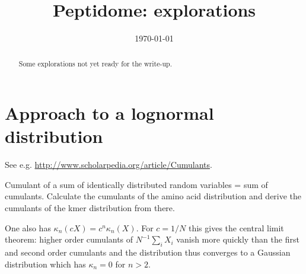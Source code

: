 \documentclass[superscriptaddress,onecolumn,pre]{revtex4}
\newcommand{\<}{\langle}
\renewcommand{\>}{\rangle}
\begin{document}
\title{Peptidome: explorations}
\date{\today}

\begin{abstract}
    Some explorations not yet ready for the write-up.
\end{abstract}

\maketitle

\section{Approach to a lognormal distribution}

See e.g. \url{http://www.scholarpedia.org/article/Cumulants}.

Cumulant of a sum of identically distributed random variables = sum of cumulants. Calculate the cumulants of the amino acid distribution and derive the cumulants of the kmer distribution from there.

One also has $\kappa_n(c X) = c^n \kappa_n(X)$. For $c = 1/N$ this gives the central limit theorem: higher order cumulants of $N^{-1} \sum_i X_i$ vanish more quickly than the first and second order cumulants and the distribution thus converges to a Gaussian distribution which has $\kappa_n = 0$ for $n>2$.
\end{document}
